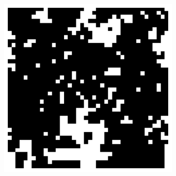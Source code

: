 \documentclass[11pt, a4paper]{report} %
\begin{document}
\begin{figure}[htb]
\begin{subfigure}[c]{0.2\linewidth}
	\end{subfigure}
	~
	\begin{subfigure}[c]{0.2\linewidth}
		\includegraphics[width=\linewidth]{20160603125617_40_by_40_Lattice_step200.pdf}
	\end{subfigure}


\end{figure}
\end{document}
